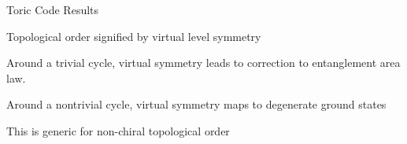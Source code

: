 \begin{frame}{Toric Code Results}
\vskip-1cm
\begin{figure}
\raggedright

\end{figure}
\vskip-1cm
\bi 
\item Topological order signified by virtual level symmetry
\item Around a trivial cycle, virtual symmetry leads to correction to entanglement area law. 
\item Around a nontrivial cycle, virtual symmetry maps to degenerate ground states
\item This is generic for non-chiral topological order
\ei 
\end{frame}
